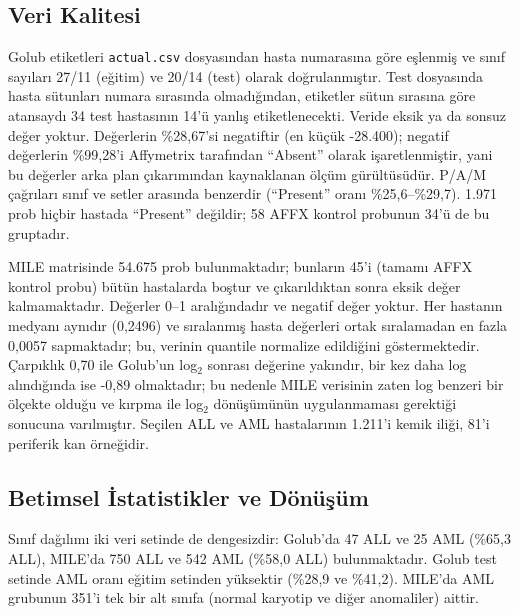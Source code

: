 \subsection{Veri Kalitesi}
Golub etiketleri \texttt{actual.csv} dosyasından hasta numarasına göre eşlenmiş ve sınıf sayıları 27/11 (eğitim) ve 20/14 (test) olarak doğrulanmıştır. Test dosyasında hasta sütunları numara sırasında olmadığından, etiketler sütun sırasına göre atansaydı 34 test hastasının 14'ü yanlış etiketlenecekti. Veride eksik ya da sonsuz değer yoktur. Değerlerin \%28,67'si negatiftir (en küçük -28.400); negatif değerlerin \%99,28'i Affymetrix tarafından ``Absent'' olarak işaretlenmiştir, yani bu değerler arka plan çıkarımından kaynaklanan ölçüm gürültüsüdür. P/A/M çağrıları sınıf ve setler arasında benzerdir (``Present'' oranı \%25,6--\%29,7). 1.971 prob hiçbir hastada ``Present'' değildir; 58 AFFX kontrol probunun 34'ü de bu gruptadır.

MILE matrisinde 54.675 prob bulunmaktadır; bunların 45'i (tamamı AFFX kontrol probu) bütün hastalarda boştur ve çıkarıldıktan sonra eksik değer kalmamaktadır. Değerler 0--1 aralığındadır ve negatif değer yoktur. Her hastanın medyanı aynıdır (0,2496) ve sıralanmış hasta değerleri ortak sıralamadan en fazla 0,0057 sapmaktadır; bu, verinin quantile normalize edildiğini göstermektedir. Çarpıklık 0,70 ile Golub'un log$_2$ sonrası değerine yakındır, bir kez daha log alındığında ise -0,89 olmaktadır; bu nedenle MILE verisinin zaten log benzeri bir ölçekte olduğu ve kırpma ile log$_2$ dönüşümünün uygulanmaması gerektiği sonucuna varılmıştır. Seçilen ALL ve AML hastalarının 1.211'i kemik iliği, 81'i periferik kan örneğidir.

\subsection{Betimsel İstatistikler ve Dönüşüm}
Sınıf dağılımı iki veri setinde de dengesizdir: Golub'da 47 ALL ve 25 AML (\%65,3 ALL), MILE'da 750 ALL ve 542 AML (\%58,0 ALL) bulunmaktadır. Golub test setinde AML oranı eğitim setinden yüksektir (\%28,9 ve \%41,2). MILE'da AML grubunun 351'i tek bir alt sınıfa (normal karyotip ve diğer anomaliler) aittir.

